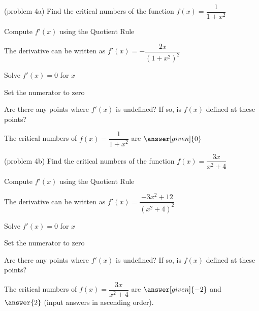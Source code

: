 \documentclass{ximera}
\begin{document}
\begin{problem}(problem 4a)
  Find the critical numbers of the function $f(x) = \dfrac{1}{1 + x^2}$
  
  
    \begin{hint}
      Compute $f'(x)$ using the Quotient Rule
    \end{hint}
    \begin{hint}
      The derivative can be written as $f'(x) = -\dfrac{2x}{(1 + x^2)^2}$
    \end{hint}
		\begin{hint}
      Solve $f'(x) = 0$ for $x$
    \end{hint}
		\begin{hint}
      Set the numerator to zero
    \end{hint}
    \begin{hint}
      Are there any points where $f'(x)$ is undefined?
      If so, is $f(x)$ defined at these points?  
		\end{hint}
    
    
		The critical numbers of $f(x) = \dfrac{1}{1 + x^2}$ are
		 $\answer[given]{0}$
		
\end{problem}

\begin{problem}(problem 4b)
  Find the critical numbers of the function $f(x) = \dfrac{3x}{x^2 +4}$
  
  
    \begin{hint}
      Compute $f'(x)$ using the Quotient Rule
    \end{hint}
    \begin{hint}
      The derivative can be written as $f'(x) = \dfrac{-3x^2 + 12}{(x^2 + 4)^2}$
    \end{hint}
		\begin{hint}
      Solve $f'(x) = 0$ for $x$
    \end{hint}
		\begin{hint}
      Set the numerator to zero
    \end{hint}
    \begin{hint}
      Are there any points where $f'(x)$ is undefined?
      If so, is $f(x)$ defined at these points?  
		\end{hint}
    
    
		The critical numbers of $f(x) = \dfrac{3x}{x^2 + 4}$ are
		 $\answer[given]{-2}$ and $\answer{2}$ 
		(input answers in ascending order).
	
\end{problem}
\end{document}
